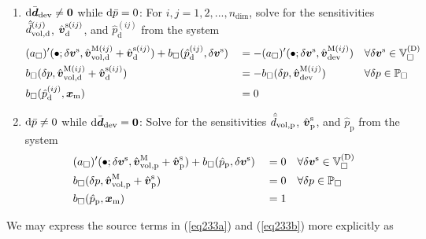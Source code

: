 \documentclass[10pt,a4paper]{article}
\newcommand{\NDIM}{n_\mathrm{dim}}
\newcommand{\ded}{\mathrm{d}}
\newcommand{\dep}{\mathrm{p}}
\begin{document}
\begin{enumerate}
\item $\operatorname{d \!}\bar{\boldsymbol{d}}_{\mathrm{dev}}\neq \boldsymbol{0}$ while $\operatorname{d \!}\bar{p}=0$: For $i,j=1,2, ..., \NDIM$, solve for the sensitivities $\hat{\bar{d}}^{(ij)}_{\vol,\ded}$, $\hat{\ta{v}}^{\fluct(ij)}_\ded$, and $\hat{p}^{(ij)}_\ded$ from the system
\begin{align}
    \label{eq233a} &
    (a_\Box)'(\bullet;\delta\ta{v}^\fluct,\hat{\ta{v}}^{\macro(ij)}_{\vol,\ded}+\hat{\ta{v}}^{\fluct(ij)}_\ded) +
    b_\Box(\hat{p}^{(ij)}_\ded,\delta\ta{v}^\fluct)
    && =
    - (a_\Box)'(\bullet;\delta\ta{v}^\fluct,\hat{\ta{v}}^{\macro(ij)}_\dev)
    && \forall \delta \ta{v}^\fluct\in\set{V}_\Box^{(\Dirichlet)}
 \\
    \label{eq233b} &
    b_\Box(\delta p,\hat{\ta{v}}^{\macro(ij)}_{\vol,\ded}+\hat{\ta{v}}^{\fluct(ij)}_\ded)
    && =
    - b_\Box(\delta p,\hat{\ta{v}}^{\macro(ij)}_\dev)
    && \forall \delta p\in\set{P}_\Box
\\
    \label{eq233c} &
    b_\Box(\hat{p}^{(ij)}_\ded,\ta{x}_\mean)
    && =
    0
    &&
\end{align}

\item $\operatorname{d \!}\bar{p}\neq 0$ while $\operatorname{d \!}\bar{\boldsymbol{d}}_{\mathrm{dev}}=\boldsymbol{0}$: Solve for the sensitivities $\hat{\bar{d}}_{\vol,\dep}$, $\hat{\ta{v}}^{\fluct}_\dep$, and $\hat{p}_\dep$ from the system
\begin{align}
    \label{eq243a} &
    (a_\Box)'(\bullet;\delta\ta{v}^\fluct,\hat{\ta{v}}^{\macro}_{\vol,\dep}+\hat{\ta{v}}^{\fluct}_\dep) +
    b_\Box(\hat{p}_\dep,\delta\ta{v}^\fluct)
    && =
    0
    && \forall \delta \ta{v}^\fluct\in\set{V}_\Box^{(\Dirichlet)}
 \\
    \label{eq243b} &
    b_\Box(\delta p,\hat{\ta{v}}^{\macro}_{\vol,\dep}+\hat{\ta{v}}^{\fluct}_\dep)
    && =
    0
    && \forall \delta p\in\set{P}_\Box
\\
    \label{eq243c} &
    b_\Box(\hat{p}_\dep,\ta{x}_\mean)
    && =
    1
    &&
\end{align}
\end{enumerate}
We may express the source terms in (\ref{eq233a}) and (\ref{eq233b}) more explicitly as
\end{document}
